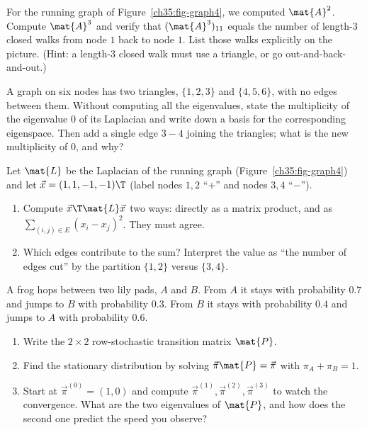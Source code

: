 \begin{exercise}
\label{ch35:ex-walks}
For the running graph of Figure~\ref{ch35:fig-graph4}, we computed $\mat{A}^2$. Compute
$\mat{A}^3$ and verify that $(\mat{A}^3)_{11}$ equals the number of length-$3$ closed walks
from node $1$ back to node $1$. List those walks explicitly on the picture. (Hint: a
length-$3$ closed walk must use a triangle, or go out-and-back-and-out.)
\end{exercise}

\begin{exercise}
\label{ch35:ex-components}
A graph on six nodes has two triangles, $\{1,2,3\}$ and $\{4,5,6\}$, with no edges between
them. Without computing all the eigenvalues, state the multiplicity of the eigenvalue $0$ of
its Laplacian and write down a basis for the corresponding eigenspace. Then add a single
edge $3\!-\!4$ joining the triangles; what is the new multiplicity of $0$, and why?
\end{exercise}

\begin{exercise}
\label{ch35:ex-energy}
Let $\mat{L}$ be the Laplacian of the running graph (Figure~\ref{ch35:fig-graph4}) and let
$\vec{x} = (1,1,-1,-1)\T$ (label nodes $1,2$ ``$+$'' and nodes $3,4$ ``$-$'').
\begin{enumerate}
\item Compute $\vec{x}\T\mat{L}\vec{x}$ two ways: directly as a matrix product, and as
$\sum_{(i,j)\in E}(x_i-x_j)^2$. They must agree.
\item Which edges contribute to the sum? Interpret the value as ``the number of edges cut''
by the partition $\{1,2\}$ versus $\{3,4\}$.
\end{enumerate}
\end{exercise}

\begin{exercise}
\label{ch35:ex-stationary}
A frog hops between two lily pads, $A$ and $B$. From $A$ it stays with probability $0.7$ and
jumps to $B$ with probability $0.3$. From $B$ it stays with probability $0.4$ and jumps to
$A$ with probability $0.6$.
\begin{enumerate}
\item Write the $2\times2$ row-stochastic transition matrix $\mat{P}$.
\item Find the stationary distribution by solving $\vec\pi\mat{P} = \vec\pi$ with
$\pi_A + \pi_B = 1$.
\item Start at $\vec\pi^{(0)} = (1,0)$ and compute $\vec\pi^{(1)}, \vec\pi^{(2)},
\vec\pi^{(3)}$ to watch the convergence. What are the two eigenvalues of $\mat{P}$, and how
does the second one predict the speed you observe?
\end{enumerate}
\end{exercise}

